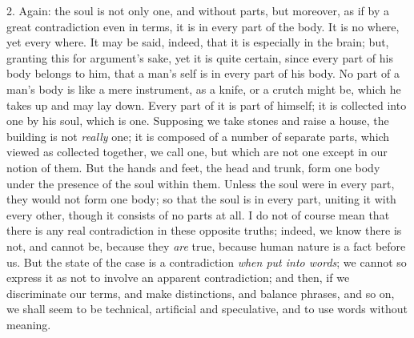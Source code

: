 2. Again: the soul is not only one, and without parts, but
moreover, as if by a great contradiction even in terms, it is in every
part of the body. It is no where, yet every where. It may be said,
indeed, that it is especially in the brain; but, granting this for
argument's sake, yet it is quite certain, since every part of his
body belongs to him, that a man's self is in every part of his body.
No part of a man's body is like a mere instrument, as a knife, or a
crutch might be, which he takes up and may lay down. Every part of it
is part of himself; it is collected into one by his soul, which is
one. Supposing we take stones and raise a house, the building is not \emph{really}
one; it is composed of a number of separate parts, which viewed as
collected together, we call one, but which are not one except in our
notion of them. But the hands and feet, the head and trunk, form one
body under the presence of the soul within them. Unless the soul were
in every part, they would not form one body; so that the soul is in
every part, uniting it with every other, though it consists of no
parts at all. I do not of course mean that there is any real
contradiction in these opposite truths; indeed, we know there is not,
and cannot be, because they \emph{are} true, because human nature is a
fact before us. But the state of the case is a contradiction \emph{when
put into words}; we cannot so express it as not to involve an
apparent contradiction; and then, if we discriminate our terms, and
make distinctions, and balance phrases, and so on, we shall seem to be
technical, artificial and speculative, and to use words without
meaning.

